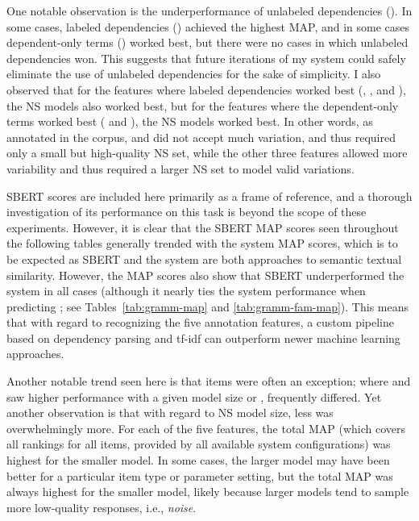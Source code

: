 One notable observation is the underperformance of unlabeled dependencies (). In some cases, labeled dependencies () achieved the highest MAP, and in some cases dependent-only terms () worked best, but there were no cases in which unlabeled dependencies won. This suggests that future iterations of my system could safely eliminate the use of unlabeled dependencies for the sake of simplicity. I also observed that for the features where labeled dependencies worked best (, , and ), the  NS models also worked best, but for the features where the dependent-only terms worked best ( and ), the  NS models worked best. In other words, as annotated in the corpus,  and  did not accept much variation, and thus required only a small but high-quality NS set, while the other three features allowed more variability and thus required a larger NS set to model valid variations.

 
SBERT scores are included here primarily as a frame of reference, and a thorough investigation of its performance on this task is beyond the scope of these experiments. However, it is clear that the SBERT MAP scores seen throughout the following tables generally trended with the system MAP scores, which is to be expected as SBERT and the system are both approaches to semantic textual similarity. However, the MAP scores also show that SBERT underperformed the system in all cases (although it nearly ties the system performance when predicting ; see Tables~\ref{tab:gramm-map} and \ref{tab:gramm-fam-map}). This means that with regard to recognizing the five annotation features, a custom pipeline based on dependency parsing and tf-idf can outperform newer machine learning approaches. 

Another notable trend seen here is that  items were often an exception; where  and  saw higher performance with a given model size or ,  frequently differed. Yet another observation is that with regard to NS model size, less was overwhelmingly more. For each of the five features, the total MAP (which covers all rankings for all items, provided by all available system configurations) was highest for the smaller model. In some cases, the larger model may have been better for a particular item type or parameter setting, but the total MAP was always highest for the smaller model, likely because larger models tend to sample more low-quality responses, i.e., \textit{noise}.

